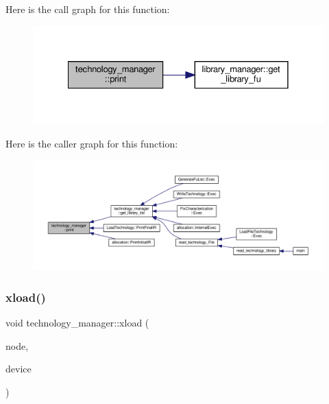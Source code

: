 Here is the call graph for this function\+:
\nopagebreak
\begin{figure}[H]
\begin{center}
\leavevmode
\includegraphics[width=328pt]{df/dc7/classtechnology__manager_a945cc92ea4b049fa9e973981a7a1dc9f_cgraph}
\end{center}
\end{figure}
Here is the caller graph for this function\+:
\nopagebreak
\begin{figure}[H]
\begin{center}
\leavevmode
\includegraphics[width=350pt]{df/dc7/classtechnology__manager_a945cc92ea4b049fa9e973981a7a1dc9f_icgraph}
\end{center}
\end{figure}
\mbox{\label{classtechnology__manager_a3e17fc1041f0bb59220379c4c9ee0eb7}} 
\subsubsection{\texorpdfstring{xload()}{xload()}}
{\footnotesize\ttfamily void technology\+\_\+manager\+::xload (\begin{DoxyParamCaption}\item[{const \hyperlink{classxml__element}{xml\+\_\+element} $\ast$}]{node,  }\item[{const \hyperlink{target__device_8hpp_acedb2b7a617e27e6354a8049fee44eda}{target\+\_\+device\+Ref}}]{device }\end{DoxyParamCaption})}




